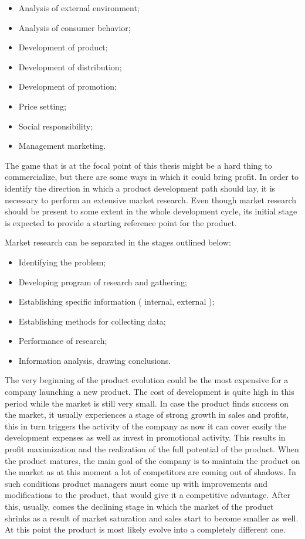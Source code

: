 \begin{itemize}
    \item Analysis of external environment;
    \item Analysis of consumer behavior;
    \item Development of product;
    \item Development of distribution;
    \item Development of promotion;
    \item Price setting;
    \item Social responsibility;
    \item Management marketing.
\end{itemize}

The game that is at the focal point of this thesis might be a hard thing to
commercialize, but there are some ways in which it could bring profit. In
order to identify the direction in which a product development path should
lay, it is necessary to perform an extensive market research. Even though
market research should be present to some extent in the whole development
cycle, its initial stage is expected to provide a starting reference point for
the product.

Market research can be separated in the stages outlined below:

\begin{itemize}
    \item Identifying the problem;
    \item Developing program of research and gathering;
    \item Establishing specific information ( internal, external );
    \item Establishing methods for collecting data;
    \item Performance of research;
    \item Information analysis, drawing conclusions.
\end{itemize}

The very beginning of the product evolution could be the most expensive for a
company launching a new product. The cost of development is quite high in this
period while the market is still very small. In case the product finds success
on the market, it usually experiences a stage of strong growth in sales and
profits, this in turn triggers the activity of the company as now it can cover
easily the development expenses as well as invest in promotional activity.
This results in profit maximization and the realization of the full potential
of the product. When the product matures, the main goal of the company is to
maintain the product on the market as at this moment a lot of competitors are
coming out of shadows. In such conditions product managers must come up with
improvements and modifications to the product, that would give it a
competitive advantage. After this, usually, comes the declining stage in which
the market of the product shrinks as a result of market saturation and sales
start to become smaller as well. At this point the product is most likely
evolve into a completely different one.

